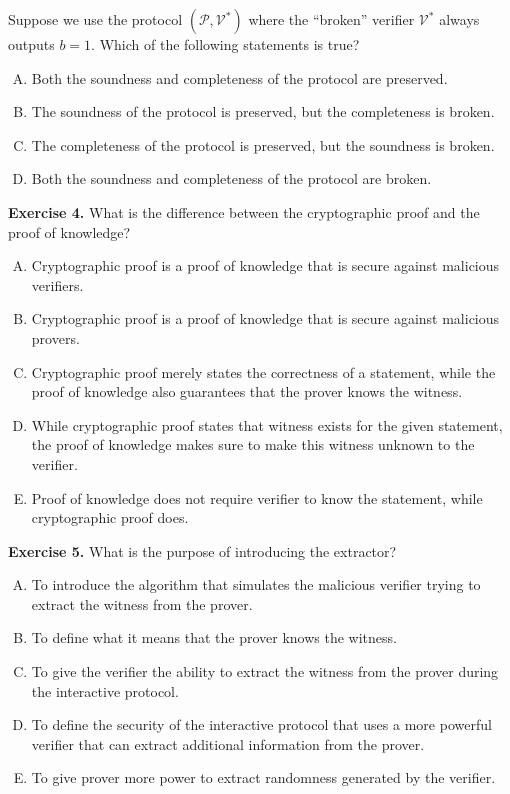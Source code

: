 \documentclass{zkdl-tests-template}
\begin{document}
Suppose we use the protocol $(\mathcal{P}, \mathcal{V}^*)$ where the ``broken'' verifier $\mathcal{V}^*$ always outputs $b=1$. Which of the following statements is true?
\begin{enumerate}[(A)]
    \item Both the soundness and completeness of the protocol are preserved.
    \item The soundness of the protocol is preserved, but the completeness is broken.
    \item The completeness of the protocol is preserved, but the soundness is broken.
    \item Both the soundness and completeness of the protocol are broken.
\end{enumerate}

\textbf{Exercise 4.} What is the difference between the cryptographic proof and the proof of knowledge?
\begin{enumerate}[(A)]
    \item Cryptographic proof is a proof of knowledge that is secure against malicious verifiers.
    \item Cryptographic proof is a proof of knowledge that is secure against malicious provers.
    \item Cryptographic proof merely states the correctness of a statement, while the proof of knowledge also guarantees that the prover knows the witness.
    \item While cryptographic proof states that witness exists for the given statement, the proof of knowledge makes sure to make this witness unknown to the verifier.
    \item Proof of knowledge does not require verifier to know the statement, while cryptographic proof does.
\end{enumerate}

\textbf{Exercise 5.} What is the purpose of introducing the extractor?
\begin{enumerate}[(A)]
    \item To introduce the algorithm that simulates the malicious verifier trying to extract the witness from the prover.
    \item To define what it means that the prover knows the witness.
    \item To give the verifier the ability to extract the witness from the prover during the interactive protocol.
    \item To define the security of the interactive protocol that uses a more powerful verifier that can extract additional information from the prover.
    \item To give prover more power to extract randomness generated by the verifier.
\end{enumerate}
\end{document}
